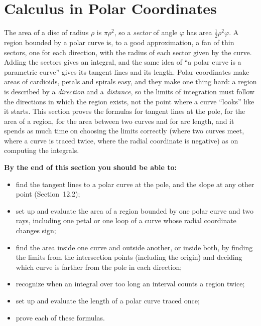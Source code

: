 \documentclass[11pt]{article}
\begin{document}
\section{Calculus in Polar Coordinates}

\begin{guide}
The area of a disc of radius $\rho$ is $\pi\rho^2$, so a \emph{sector} of angle $\varphi$ has area $\frac12\rho^2\varphi$. A region bounded by a polar curve is, to a good approximation, a fan of thin sectors, one for each direction, with the radius of each sector given by the curve. Adding the sectors gives an integral, and the same idea of ``a polar curve is a parametric curve'' gives its tangent lines and its length. Polar coordinates make areas of cardioids, petals and spirals easy, and they make one thing hard: a region is described by a \emph{direction} and a \emph{distance}, so the limits of integration must follow the directions in which the region exists, not the point where a curve ``looks'' like it starts. This section proves the formulas for tangent lines at the pole, for the area of a region, for the area between two curves and for arc length, and it spends as much time on choosing the limits correctly (where two curves meet, where a curve is traced twice, where the radial coordinate is negative) as on computing the integrals.
\end{guide}

\textbf{By the end of this section you should be able to:}
\begin{itemize}
  \item find the tangent lines to a polar curve at the pole, and the slope at any other point (Section~12.2);
  \item set up and evaluate the area of a region bounded by one polar curve and two rays, including one petal or one loop of a curve whose radial coordinate changes sign;
  \item find the area inside one curve and outside another, or inside both, by finding the limits from the intersection points (including the origin) and deciding which curve is farther from the pole in each direction;
  \item recognize when an integral over too long an interval counts a region twice;
  \item set up and evaluate the length of a polar curve traced once;
  \item prove each of these formulas.
\end{itemize}

\end{document}
